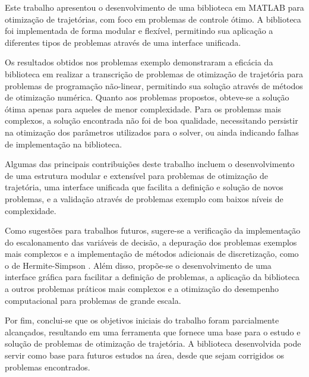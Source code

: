 Este trabalho apresentou o desenvolvimento de uma biblioteca em MATLAB para otimização de trajetórias, com foco em problemas de controle ótimo. A biblioteca foi implementada de forma modular e flexível, permitindo sua aplicação a diferentes tipos de problemas através de uma interface unificada.

Os resultados obtidos nos problemas exemplo demonstraram a eficácia da biblioteca em realizar a transcrição de problemas de otimização de trajetória para problemas de programação não-linear, permitindo sua solução através de métodos de otimização numérica. Quanto aos problemas propostos, obteve-se a solução ótima apenas para aqueles de menor complexidade. Para os problemas mais complexos, a solução encontrada não foi de boa qualidade, necessitando persistir na otimização dos parâmetros utilizados para o solver, ou ainda indicando falhas de implementação na biblioteca.

Algumas das principais contribuições deste trabalho incluem o desenvolvimento de uma estrutura modular e extensível para problemas de otimização de trajetória, uma interface unificada que facilita a definição e solução de novos problemas, e a validação através de problemas exemplo com baixos níveis de complexidade.

Como sugestões para trabalhos futuros, sugere-se a verificação da implementação do escalonamento das variáveis de decisão, a depuração dos problemas exemplos mais complexos e a implementação de métodos adicionais de discretização, como o de Hermite-Simpson \cite{kelly_introduction_2017,betts_practical_2010}. Além disso, propõe-se o desenvolvimento de uma interface gráfica para facilitar a definição de problemas, a aplicação da biblioteca a outros problemas práticos mais complexos e a otimização do desempenho computacional para problemas de grande escala.

Por fim, conclui-se que os objetivos iniciais do trabalho foram parcialmente alcançados, resultando em uma ferramenta que fornece uma base para o estudo e solução de problemas de otimização de trajetória. A biblioteca desenvolvida pode servir como base para futuros estudos na área, desde que sejam corrigidos os problemas encontrados.
